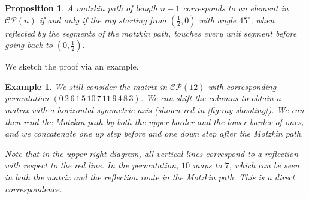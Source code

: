 \documentclass[pdflatex,sn-mathphys-num]{sn-jnl}%
\theoremstyle{thmstyleone}%
\newtheorem{proposition}[theorem]{Proposition}
\theoremstyle{thmstyletwo}%
\newtheorem{example}[theorem]{Example}
\theoremstyle{thmstylethree}%
\numberwithin{equation}{section}
\begin{document}
        \begin{proposition}
            A motzkin path of length $n-1$ corresponds to an element in $\mathcal{CP}(n)$ if and only if the ray starting from $(\frac{1}{2},0)$ with angle $45^\circ$, when reflected by the segments of the motzkin path, touches every unit segment before going back to $(0,\frac{1}{2})$. 
        \end{proposition}
        We sketch the proof via an example.
        \begin{example}
            We still consider the matrix in $\mathcal{CP}(12)$ with corresponding permutation $(0\,2\,6\,1\,5\,10\,7\,11\,9\,4\,8\,3)$. We can shift the columns to obtain a matrix with a horizontal symmetric axis (shown red in \cref{fig:ray-shooting}). We can then read the Motzkin path by both the upper border and the lower border of ones, and we concatenate one up step before and one down step after the Motzkin path.

            Note that in the upper-right diagram, all vertical lines correspond to a reflection with respect to the red line. In the permutation, $10$ maps to $7$, which can be seen in both the matrix and the reflection route in the Motzkin path. This is a direct correspondence.
        \end{example}
\end{document}
